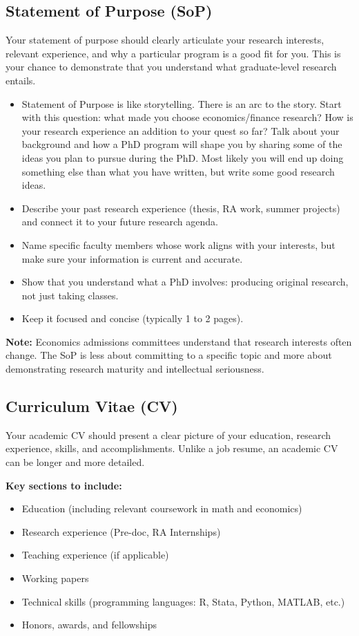 \documentclass[11pt, letterpaper]{article}
\begin{document}
\subsection{Statement of Purpose (SoP)}

Your statement of purpose should clearly articulate your research interests, relevant experience, and why a particular program is a good fit for you. This is your chance to demonstrate that you understand what graduate-level research entails.

\begin{itemize}[leftmargin=*, itemsep=2pt]
    \item Statement of Purpose is like storytelling. There is an arc to the story. Start with this question: what made you choose economics/finance research? How is your research experience an addition to your quest so far? Talk about your background and how a PhD program will shape you by sharing some of the ideas you plan to pursue during the PhD. Most likely you will end up doing something else than what you have written, but write some good research ideas.
    \item Describe your past research experience (thesis, RA work, summer projects) and connect it to your future research agenda.
    \item Name specific faculty members whose work aligns with your interests, but make sure your information is current and accurate.
    \item Show that you understand what a PhD involves: producing original research, not just taking classes.
    \item Keep it focused and concise (typically 1 to 2 pages).
\end{itemize}

\textbf{Note:} Economics admissions committees understand that research interests often change. The SoP is less about committing to a specific topic and more about demonstrating research maturity and intellectual seriousness.


\subsection{Curriculum Vitae (CV)}

Your academic CV should present a clear picture of your education, research experience, skills, and accomplishments. Unlike a job resume, an academic CV can be longer and more detailed.

\textbf{Key sections to include:}
\begin{itemize}[leftmargin=*, itemsep=2pt]
    \item Education (including relevant coursework in math and economics)
    \item Research experience (Pre-doc, RA Internships)
    \item Teaching experience (if applicable)
    \item Working papers
    \item Technical skills (programming languages: R, Stata, Python, MATLAB, etc.)
    \item Honors, awards, and fellowships
\end{itemize}
\end{document}
